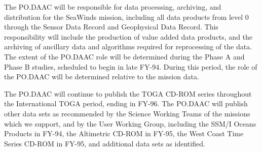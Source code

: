 	The PO.DAAC will be responsible for data processing, archiving, and 
distribution for the SeaWinds  mission, including all data products from 
level 0 through the Sensor Data Record and Geophysical Data Record.  This 
responsibility will include the production of value added data products, 
and the archiving of ancillary data and algorithms required for 
reprocessing of the data.  The extent of the PO.DAAC role will be 
determined during the Phase A and Phase B studies, scheduled to begin in 
late FY-94.  During this period, the role of the PO.DAAC will be determined 
relative to the mission data.

	The PO.DAAC will continue to publish the TOGA CD-ROM series 
throughout the International TOGA period, ending in FY-96.  The PO.DAAC 
will publish other data sets as recommended by the Science Working 
Teams of the missions which we support, and by the User Working Group, 
including the SSM/I Oceans Products in FY-94, the Altimetric CD-ROM in 
FY-95, the West Coast Time Series CD-ROM in FY-95, and additional data 
sets as identified.
\newpage

